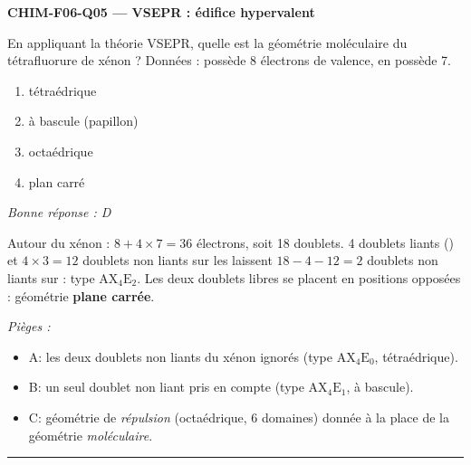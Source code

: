 \documentclass[11pt,a4paper]{article}
\begin{document}
\noindent\textbf{CHIM-F06-Q05 --- VSEPR : édifice hypervalent}\par
En appliquant la théorie VSEPR, quelle est la géométrie moléculaire du tétrafluorure de xénon
 ? Données :  possède 8 électrons de valence,  en possède 7.
\begin{enumerate}[label=\Alph*)]
\item tétraédrique
\item à bascule (papillon)
\item octaédrique
\item plan carré
\end{enumerate}
\textit{Bonne réponse : D}\par
Autour du xénon : $8 + 4\times7 = 36$ électrons, soit 18 doublets. 4 doublets liants () et
$4\times3=12$ doublets non liants sur les  laissent $18-4-12=2$ doublets non liants sur  :
type $\mathrm{AX_4E_2}$. Les deux doublets libres se placent en positions opposées : géométrie
\textbf{plane carrée}.\par
\textit{Pièges :}
\begin{itemize}
\item A: les deux doublets non liants du xénon ignorés (type $\mathrm{AX_4E_0}$, tétraédrique).
\item B: un seul doublet non liant pris en compte (type $\mathrm{AX_4E_1}$, à bascule).
\item C: géométrie de \emph{répulsion} (octaédrique, 6 domaines) donnée à la place de la géométrie \emph{moléculaire}.
\end{itemize}
\vspace{8pt}\hrule\vspace{8pt}
\end{document}
